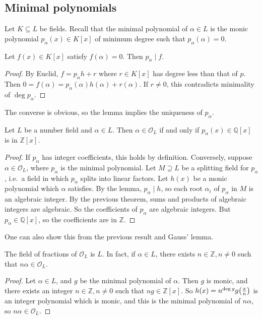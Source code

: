 \subsection{Minimal polynomials}
Let \( K \subseteq L \) be fields.
Recall that the minimal polynomial of \( \alpha \in L \) is the monic polynomial \( p_\alpha(x) \in K[x] \) of minimum degree such that \( p_\alpha(\alpha) = 0 \).
\begin{lemma}
    Let \( f(x) \in K[x] \) satisfy \( f(\alpha) = 0 \).
    Then \( p_\alpha \mid f \).
\end{lemma}
\begin{proof}
    By Euclid, \( f = p_\alpha h + r \) where \( r \in K[x] \) has degree less than that of \( p \).
    Then \( 0 = f(\alpha) = p_\alpha(\alpha) h(\alpha) + r(\alpha) \).
    If \( r \neq 0 \), this contradicts minimality of \( \deg p_\alpha \).
\end{proof}
The converse is obvious, so the lemma implies the uniqueness of \( p_\alpha \).
\begin{proposition}
    Let \( L \) be a number field and \( \alpha \in L \).
    Then \( \alpha \in \mathcal O_L \) if and only if \( p_\alpha(x) \in \mathbb Q[x] \) is in \( \mathbb Z[x] \).
\end{proposition}
\begin{proof}
    If \( p_\alpha \) has integer coefficients, this holds by definition.
    Conversely, suppose \( \alpha \in \mathcal O_L \), where \( p_\alpha \) is the minimal polynomial.
    Let \( M \supseteq L \) be a splitting field for \( p_\alpha \), i.e.\, a field in which \( p_\alpha \) splits into linear factors.
    Let \( h(x) \) be a monic polynomial which \( \alpha \) satisfies.
    By the lemma, \( p_\alpha \mid h \), so each root \( \alpha_i \) of \( p_\alpha \) in \( M \) is an algebraic integer.
    By the previous theorem, sums and products of algebraic integers are algebraic.
    So the coefficients of \( p_\alpha \) are algebraic integers.
    But \( p_\alpha \in \mathbb Q[x] \), so the coefficients are in \( \mathbb Z \).
\end{proof}
\begin{remark}
    One can also show this from the previous result and Gauss' lemma.
\end{remark}
\begin{lemma}
    The field of fractions of \( \mathcal O_L \) is \( L \).
    In fact, if \( \alpha \in L \), there exists \( n \in \mathbb Z, n \neq 0 \) such that \( n\alpha \in \mathcal O_L \).
\end{lemma}
\begin{proof}
    Let \( \alpha \in L \), and \( g \) be the minimal polynomial of \( \alpha \).
    Then \( g \) is monic, and there exists an integer \( n \in \mathbb Z, n \neq 0 \) such that \( ng \in \mathbb Z[x] \).
    So \( h(x) = n^{\deg g} g\qty(\frac{x}{n}) \) is an integer polynomial which is monic, and this is the minimal polynomial of \( n\alpha \), so \( n\alpha \in \mathcal O_L \).
\end{proof}

